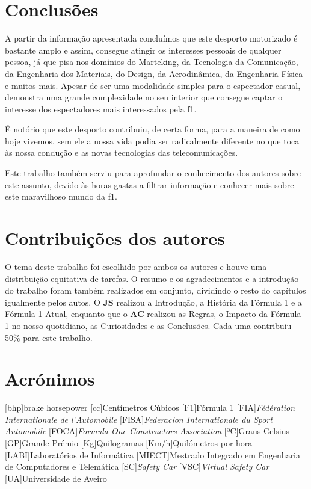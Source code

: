 \documentclass{report}
\begin{document}
\chapter{Conclusões}
\label{chap.conclusoes}
\hspace{\parindent}A partir da informação apresentada concluímos que este desporto motorizado é bastante amplo e assim, consegue atingir os interesses pessoais de qualquer pessoa, já que pisa nos domínios do Marteking, da Tecnologia da Comunicação, da Engenharia dos Materiais, do Design, da Aerodinâmica, da Engenharia Física e muitos mais. Apesar de ser uma modalidade simples para o espectador casual, demonstra uma grande complexidade no seu interior que consegue captar o interesse dos espectadores mais interessados pela \ac{f1}.

É notório que este desporto contribuiu, de certa forma, para a maneira de como hoje vivemos, sem ele a nossa vida podia ser radicalmente diferente no que toca às nossa condução e as novas tecnologias das telecomunicações.

Este trabalho também serviu para aprofundar o conhecimento dos autores sobre este assunto, devido às horas gastas a filtrar informação e conhecer mais sobre este maravilhoso mundo da \ac{f1}.
\chapter*{Contribuições dos autores}
\hspace{\parindent}O tema deste trabalho foi escolhido por ambos os autores e houve uma distribuição equitativa de tarefas. O resumo e os agradecimentos e a introdução do trabalho foram também realizados em conjunto, dividindo o resto do capítulos igualmente pelos autos. O \textbf{JS} realizou a Introdução, a História da Fórmula 1 e a Fórmula 1 Atual, enquanto que o \textbf{AC} realizou as Regras, o Impacto da Fórmula 1 no nosso quotidiano, as Curiosidades e as Conclusões. Cada uma contribuiu 50\% para este trabalho.
\chapter*{Acrónimos}
\begin{acronym}
[bhp]{brake horsepower}
[cc]{Centímetros Cúbicos}
[F1]{Fórmula 1}
[FIA]{\textit{Fédération Internationale de l'Automobile}}
[FISA]{\textit{Federacion Internationale du Sport Automobile}}
[FOCA]{\textit{Formula One Constructors Association}}
[ºC]{Graus Celsius}
[GP]{Grande Prémio}
[Kg]{Quilogramas}
[Km/h]{Quilómetros por hora}
[LABI]{Laboratórios de Informática}
[MIECT]{Mestrado Integrado em Engenharia de Computadores e Telemática}
[SC]{\textit{Safety Car}}
[VSC]{\textit{Virtual Safety Car}}
[UA]{Universidade de Aveiro}
\end{acronym}
\printbibliography
\end{document}
